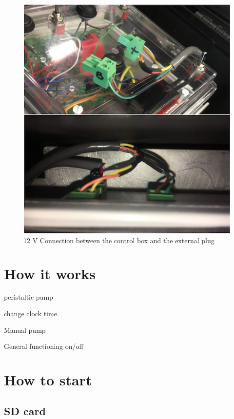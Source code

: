 \documentclass[]{book}
\begin{document}
\begin{figure}

{\centering \includegraphics[width=0.8\linewidth]{pictures/ControlBoxConnectionValveRS485} 

}

\caption{12 V Connection between the control box and the external plug}\label{fig:ControlBoxConnectionValveRS485}
\end{figure}

\hypertarget{how-it-works}{%
\section{How it works}\label{how-it-works}}

peristaltic pump

change clock time

Manual pump

General functioning on/off

\hypertarget{how-to-start}{%
\section{How to start}\label{how-to-start}}

\hypertarget{sd-card}{%
\subsection{SD card}\label{sd-card}}
\end{document}
